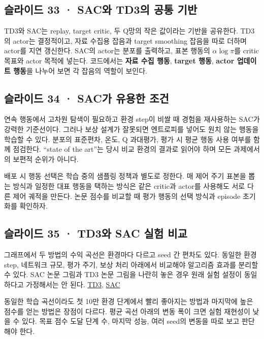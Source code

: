 \documentclass[11pt,a4paper]{article}
\begin{document}
\subsection{슬라이드 33 · SAC와 TD3의 공통 기반}

TD3와 SAC는 replay, target critic, 두 Q망의 작은 값이라는 기반을 공유한다. TD3의 actor는 결정적이고, 자료 수집용 잡음과 target smoothing 잡음을 따로 더하며 actor를 지연 갱신한다. SAC의 actor는 분포를 출력하고, 표본 행동의 $\alpha\log\pi$를 critic 목표와 actor 목적에 넣는다. 코드에서는 \textbf{자료 수집 행동}, \textbf{target 행동}, \textbf{actor 업데이트 행동}을 나누어 보면 각 잡음의 역할이 보인다.\par

\subsection{슬라이드 34 · SAC가 유용한 조건}

연속 행동에서 고차원 탐색이 필요하고 환경 step이 비쌀 때 경험을 재사용하는 SAC가 강력한 기준선이다. 그러나 보상 설계가 잘못되면 엔트로피를 넣어도 원치 않는 행동을 학습할 수 있다. 분포의 표준편차, 온도, Q 과대평가, 평가 시 평균 행동 사용 여부를 함께 점검한다. “state of the art”는 당시 비교 환경의 결과로 읽어야 하며 모든 과제에서의 보편적 순위가 아니다.\par

배포 시 행동 선택은 학습 중의 샘플링 정책과 별도로 정한다. 매 제어 주기 표본을 뽑는 방식과 일정한 대표 행동을 택하는 방식은 같은 critic과 actor를 사용해도 서로 다른 제어 궤적을 만든다. 논문 점수를 비교할 때 평가 행동의 선택 방식과 episode 초기화를 확인하자.\par

\subsection{슬라이드 35 · TD3와 SAC 실험 비교}

그래프에서 두 방법의 수익 곡선은 환경마다 다르고 seed 간 편차도 있다. 동일한 환경 step, 네트워크 규모, 평가 주기, 보상 처리 아래에서 비교해야 알고리즘 효과를 분리할 수 있다. SAC 논문 그림과 TD3 논문 그림을 나란히 놓은 경우 원래 실험 설정이 동일하다고 가정해서는 안 된다. \href{https://arxiv.org/abs/1802.09477}{TD3}, \href{https://arxiv.org/abs/1801.01290}{SAC}\par

동일한 학습 곡선이라도 첫 10만 환경 단계에서 빨리 좋아지는 방법과 마지막에 높은 점수를 얻는 방법은 장점이 다르다. 평균 곡선 아래의 변동 폭이 크면 실험 재현성이 낮을 수 있다. 목표 점수 도달 단계 수, 마지막 성능, 여러 seed의 변동을 따로 보고 판단해야 한다.\par
\end{document}
